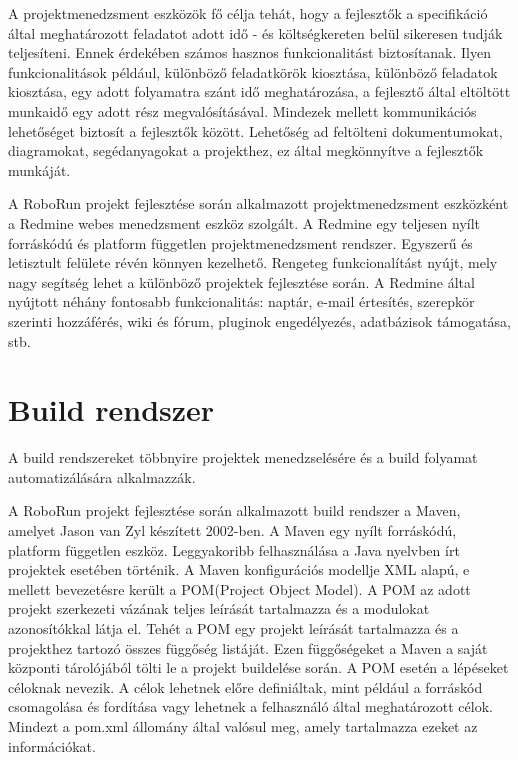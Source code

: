 	A projektmenedzsment eszközök fő célja tehát, hogy a fejlesztők a specifikáció által meghatározott feladatot adott idő - és költségkereten belül sikeresen tudják teljesíteni. Ennek érdekében számos hasznos funkcionalitást biztosítanak. Ilyen funkcionalitások például, különböző feladatkörök kiosztása, különböző feladatok kiosztása, egy adott folyamatra szánt idő meghatározása, a fejlesztő által eltöltött munkaidő egy adott rész megvalósításával. Mindezek mellett kommunikációs lehetőséget biztosít a fejlesztők között. Lehetőség ad feltölteni dokumentumokat, diagramokat, segédanyagokat a projekthez, ez által megkönnyítve a fejlesztők munkáját. 
	
	A RoboRun projekt fejlesztése során alkalmazott projektmenedzsment eszközként a Redmine\citep{redmine} webes menedzsment eszköz szolgált. A Redmine egy teljesen  nyílt forráskódú és platform független projektmenedzsment rendszer. Egyszerű és letisztult felülete révén könnyen kezelhető. Rengeteg funkcionalítást nyújt, mely nagy segítség lehet a különböző projektek fejlesztése során. A  Redmine által nyújtott néhány fontosabb funkcionalitás: naptár, e-mail értesítés, szerepkör szerinti hozzáférés, wiki és fórum, pluginok engedélyezés, adatbázisok támogatása, stb.



\section{Build rendszer}

A build rendszereket többnyire projektek menedzselésére és a build folyamat automatizálására alkalmazzák. 

	A RoboRun projekt fejlesztése során alkalmazott build rendszer a Maven\cite{maven}, amelyet Jason van Zyl készített 2002-ben. A Maven egy nyílt forráskódú, platform független eszköz. Leggyakoribb felhasználása a Java nyelvben írt projektek esetében történik. A Maven konfigurációs modellje XML alapú, e mellett bevezetésre került a POM(Project Object Model). A POM az adott projekt szerkezeti vázának teljes leírását tartalmazza és a modulokat azonosítókkal látja el. Tehét a POM egy projekt leírását tartalmazza és a projekthez tartozó összes függőség listáját. Ezen függőségeket a Maven a saját központi tárolójából tölti le a projekt buildelése során. A POM esetén a lépéseket céloknak nevezik. A célok lehetnek előre definiáltak, mint például a forráskód csomagolása és fordítása vagy lehetnek a felhasználó által meghatározott célok.  Mindezt a pom.xml állomány által valósul meg, amely tartalmazza ezeket az információkat. 
	
